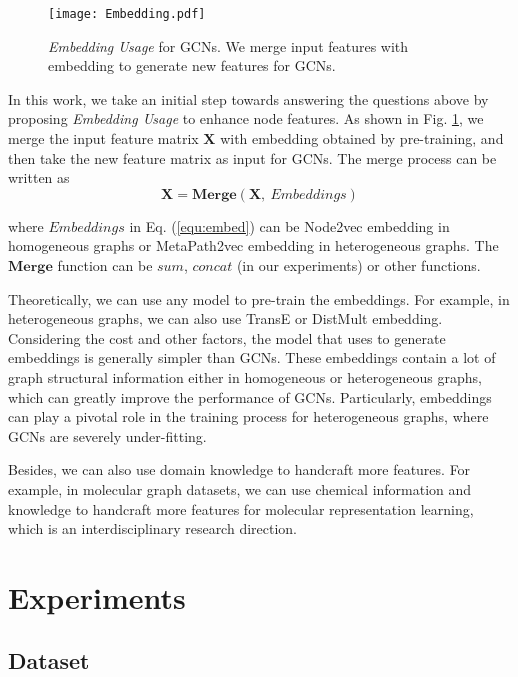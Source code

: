 \documentclass[runningheads]{llncs}
\begin{document}
\begin{figure}[htbp]
    \centering
    \texttt{[image: Embedding.pdf]}
    \caption{\textsl{Embedding Usage} for GCNs. We merge input features with embedding to generate new features for GCNs.}
    \label{fig:Embedding}
\end{figure}

In this work, we take an initial step towards answering the
questions above by proposing \textsl{Embedding Usage} to enhance node features. As shown in Fig. \ref{fig:Embedding}, we merge
the input feature matrix \(\bm{X}\) with embedding obtained by
pre-training, and then take the new feature matrix as input for GCNs. The merge process can be written as
\begin{equation} \label{equ:embed}
    \bm{X} = \mathbf{Merge}\left(\bm{X},\  Embeddings\right)  
\end{equation}

where $Embeddings$ in Eq. (\ref{equ:embed}) can be Node2vec embedding in homogeneous graphs or MetaPath2vec \cite{dong2017metapath2vec} embedding in heterogeneous graphs. The $\mathbf{Merge}$ function can be $sum$, $concat$ (in our
experiments) or other functions. 

Theoretically, we can use any model to pre-train the embeddings. For
example, in heterogeneous graphs, we can also use TransE \cite{bordes2013translating} or DistMult \cite{yang2014embedding} 
embedding. Considering the cost and other factors, the model that uses to generate embeddings is
generally simpler than GCNs. These embeddings contain a lot of graph structural
information either in homogeneous or 
heterogeneous graphs, which can greatly improve the performance of GCNs.
Particularly, embeddings can play a pivotal role in the training process for heterogeneous graphs, where GCNs are severely under-fitting.

Besides, we can also use domain knowledge to
handcraft more features. For example, in molecular graph datasets, we can use chemical information and knowledge to handcraft more features for molecular representation learning, which is an interdisciplinary research direction.

\section{Experiments}\label{experiments}
\subsection{Dataset}
\end{document}
